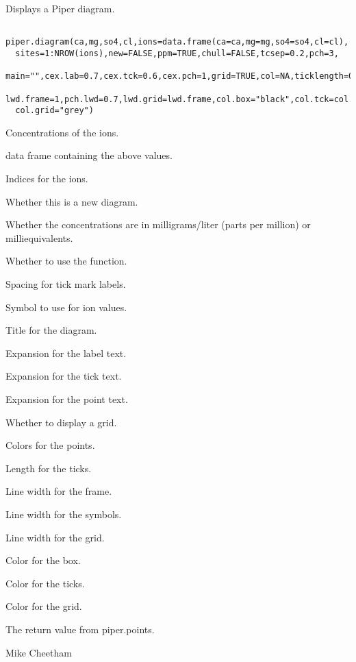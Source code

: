 \begin{Description}\relax
Displays a Piper diagram.
\end{Description}
\begin{Usage}
\begin{verbatim}
 piper.diagram(ca,mg,so4,cl,ions=data.frame(ca=ca,mg=mg,so4=so4,cl=cl),
  sites=1:NROW(ions),new=FALSE,ppm=TRUE,chull=FALSE,tcsep=0.2,pch=3,
  main="",cex.lab=0.7,cex.tck=0.6,cex.pch=1,grid=TRUE,col=NA,ticklength=0.03,
  lwd.frame=1,pch.lwd=0.7,lwd.grid=lwd.frame,col.box="black",col.tck=col.box,
  col.grid="grey")
\end{verbatim}
\end{Usage}
\begin{Arguments}
\begin{ldescription}
\item[\code{ca,mg,so4,cl}] Concentrations of the ions.
\item[\code{ions}] data frame containing the above values.
\item[\code{sites}] Indices for the ions.
\item[\code{new}] Whether this is a new diagram.
\item[\code{ppm}] Whether the concentrations are in milligrams/liter (parts per
million) or milliequivalents.
\item[\code{chull}] Whether to use the  function.
\item[\code{tcsep}] Spacing for tick mark labels.
\item[\code{pch}] Symbol to use for ion values.
\item[\code{main}] Title for the diagram.
\item[\code{cex.lab}] Expansion for the label text.
\item[\code{cex.tck}] Expansion for the tick text.
\item[\code{cex.pch}] Expansion for the point text.
\item[\code{grid}] Whether to display a grid.
\item[\code{col}] Colors for the points.
\item[\code{ticklength}] Length for the ticks.
\item[\code{lwd.frame}] Line width for the frame.
\item[\code{pch.lwd}] Line width for the symbols.
\item[\code{lwd.grid}] Line width for the grid.
\item[\code{col.box}] Color for the box.
\item[\code{col.tck}] Color for the ticks.
\item[\code{col.grid}] Color for the grid.
\end{ldescription}
\end{Arguments}
\begin{Value}
The return value from piper.points.
\end{Value}
\begin{Author}\relax
Mike Cheetham
\end{Author}

